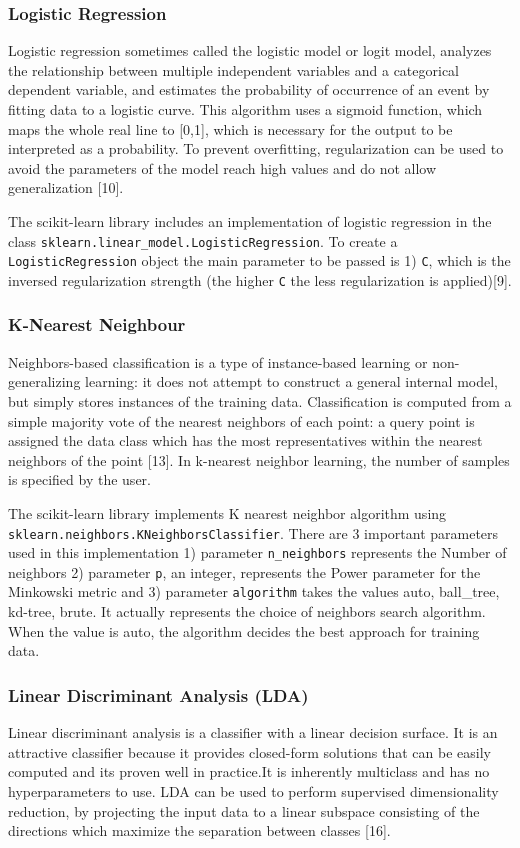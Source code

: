 \documentclass[letterpaper,10pt]{article}
\theoremstyle{mytheor}
\begin{document}
\subsubsection{Logistic Regression}
Logistic regression sometimes called the logistic model or logit model, analyzes the relationship between multiple independent variables and a categorical dependent variable, and estimates the probability of occurrence of an event by fitting data to a logistic curve. This algorithm uses a sigmoid function, which maps the whole real line to [0,1], which is necessary for the output to be interpreted as a probability. To prevent overfitting, regularization can be used to avoid the parameters of the model reach high values and do not allow generalization [10].

The scikit-learn library includes an implementation of logistic regression in the class \lstinline|sklearn.linear_model.LogisticRegression|. To create a \lstinline|LogisticRegression| object the main parameter to be passed is 1) \lstinline|C|, which is the inversed regularization strength (the higher \lstinline|C| the less regularization is applied)[9]. 

\subsubsection{K-Nearest Neighbour}
Neighbors-based classification is a type of instance-based learning or non-generalizing learning: it does not attempt to construct a general internal model, but simply stores instances of the training data. Classification is computed from a simple majority vote of the nearest neighbors of each point: a query point is assigned the data class which has the most representatives within the nearest neighbors of the point [13]. In k-nearest neighbor learning, the number of samples is specified by the user.

The scikit-learn library implements K nearest neighbor algorithm using \lstinline|sklearn.neighbors.KNeighborsClassifier|. There are 3 important parameters used in this implementation 1) parameter \lstinline|n_neighbors| represents the Number of neighbors  2) parameter \lstinline|p|, an integer, represents the Power parameter for the Minkowski metric and 3) parameter \lstinline|algorithm| takes the values auto, ball\_tree, kd-tree, brute. It actually represents the choice of neighbors search algorithm. When the value is auto, the algorithm decides the best approach for training data.

\subsubsection{Linear Discriminant Analysis (LDA)}
Linear discriminant analysis is a classifier with a linear decision surface. It is an attractive classifier because it provides closed-form solutions that can be easily computed and its proven well in practice.It is inherently multiclass and has no hyperparameters to use. LDA can be used to perform supervised dimensionality reduction, by projecting the input data to a linear subspace consisting of the directions which maximize the separation between classes [16].
\end{document}
